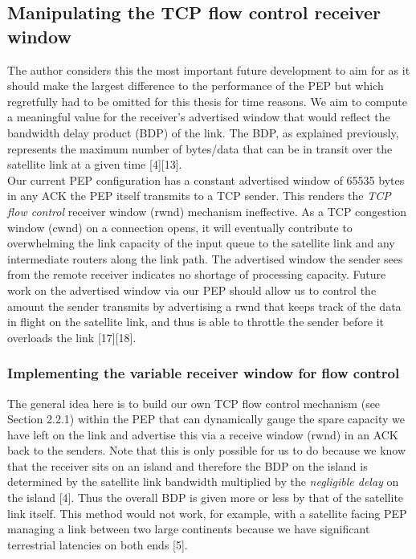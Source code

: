 \documentclass{uathesis}
\begin{document}
\subsection{Manipulating the TCP flow control receiver window}

The author considers this the most important future development to aim for as it should make the largest difference to the performance of the PEP but which regretfully had to be omitted for this thesis for time reasons. We aim to compute a meaningful value for the receiver's advertised window that would reflect the bandwidth delay product (BDP) of the link. The BDP, as explained previously, represents the maximum number of bytes/data that can be in transit over the satellite link at a given time [4][13]. \\

Our current PEP configuration has a constant advertised window of 65535 bytes in any ACK the PEP itself transmits to a TCP sender. This renders the \emph{TCP flow control} receiver window (rwnd) mechanism ineffective. As a TCP congestion window (cwnd) on a connection opens, it will eventually contribute to overwhelming the link capacity of the input queue to the satellite link and any intermediate routers along the link path. The advertised window the sender sees from the remote receiver indicates no shortage of processing capacity. Future work on the advertised window via our PEP should allow us to control the amount the sender transmits by advertising a rwnd that keeps track of the data in flight on the satellite link, and thus is able to throttle the sender before it overloads the link [17][18].

\subsubsection{Implementing the variable receiver window for flow control}
The general idea here is to build our own TCP flow control mechanism (see Section 2.2.1) within the PEP that can dynamically gauge the spare capacity we have left on the link and advertise this via a receive window (rwnd) in an ACK back to the senders. Note that this is only possible for us to do because we know that the receiver sits on an island and therefore the BDP on the island is determined by the satellite link bandwidth multiplied by the \emph{negligible delay} on the island [4]. Thus the overall BDP is given more or less by that of the satellite link itself. This method would not work, for example,  with a satellite facing PEP managing a link between two large continents because we have significant terrestrial latencies on both ends [5].\\
\end{document}
